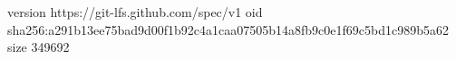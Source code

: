 version https://git-lfs.github.com/spec/v1
oid sha256:a291b13ee75bad9d00f1b92c4a1caa07505b14a8fb9c0e1f69c5bd1c989b5a62
size 349692
